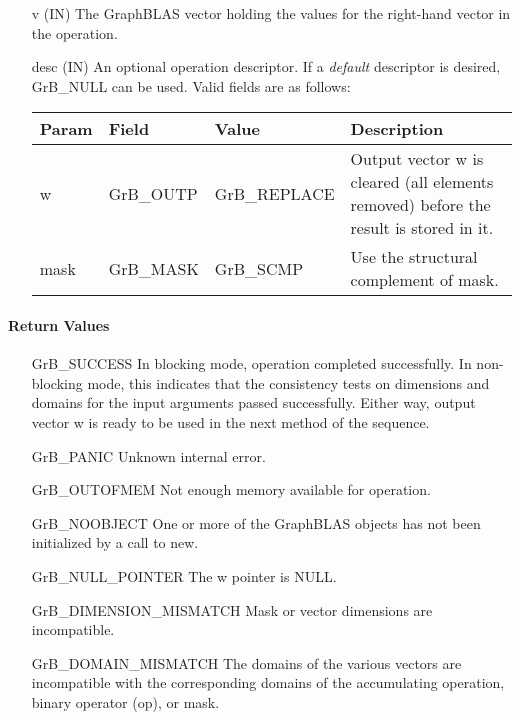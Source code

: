 \begin{itemize}[leftmargin=1.1in]
    \item[{\sf v}]     ({\sf IN}) The GraphBLAS vector holding the values for
    the right-hand vector in the operation.

    \item[{\sf desc}]  ({\sf IN}) An optional operation descriptor.  If a \emph{default}
    descriptor is desired, {\sf GrB\_NULL} can be used.  Valid fields are
    as follows: \\
    
    \begin{tabular}{lllp{2.5in}}
        Param & Field  & Value & Description \\
        \hline
        {\sf w}    & {\sf GrB\_OUTP} & {\sf GrB\_REPLACE} & Output vector {\sf w}
        is cleared (all elements removed) before the result is stored in it. \\
        
        {\sf mask} & {\sf GrB\_MASK} & {\sf GrB\_SCMP}   & Use the structural 
        complement of {\sf mask}. \\
    \end{tabular}
\end{itemize}

\paragraph{Return Values}

\begin{itemize}[leftmargin=2.1in]
    \item[{\sf GrB\_SUCCESS}]         In blocking mode, operation
	completed successfully. In non-blocking mode, this indicates
	that the consistency tests on dimensions and domains for the
	input arguments passed successfully. Either way, output vector
	{\sf w} is ready to be used in the next method of the sequence.

    \item[{\sf GrB\_PANIC}]           Unknown internal error.
    
    \item[{\sf GrB\_OUTOFMEM}]        Not enough memory available for operation.
    
    \item[{\sf GrB\_NOOBJECT}]        One or more of the GraphBLAS objects has
    not been initialized by a call to {\sf new}.
    
    \item[{\sf GrB\_NULL\_POINTER}]  The {\sf w} pointer is {\sf NULL}.

    \item[{\sf GrB\_DIMENSION\_MISMATCH}] Mask or vector dimensions are incompatible.

	\item[{\sf GrB\_DOMAIN\_MISMATCH}]    The domains of the various
	vectors are incompatible with the corresponding domains of the
	accumulating operation, binary operator ({\sf op}), or mask.
\end{itemize}

